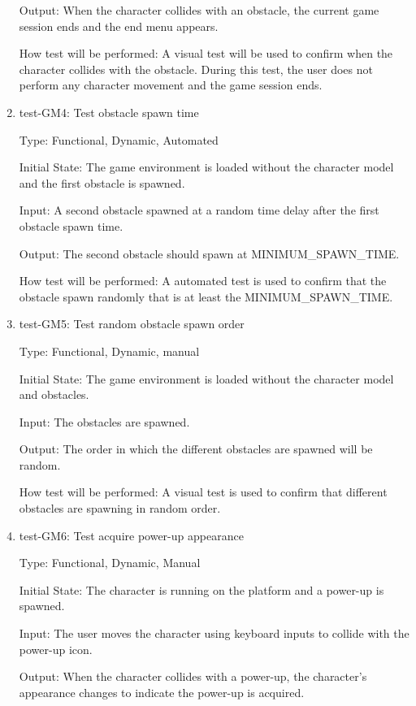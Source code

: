 \documentclass[12pt, titlepage]{article}
\begin{document}
\begin{enumerate}
Output: When the character collides with an obstacle, the current game session ends and the end menu appears.
					
How test will be performed: A visual test will be used to confirm when the character collides with the obstacle. During this test, the user does not perform any character movement and the game session ends.


\item{test-GM4: Test obstacle spawn time\\}

Type: Functional, Dynamic, Automated
					
Initial State: The game environment is loaded without the character model and the first obstacle is spawned.
					
Input: A second obstacle spawned at a random time delay after the first obstacle spawn time.  
					
Output: The second obstacle should spawn at MINIMUM\_SPAWN\_TIME. 
					
How test will be performed: A automated test is used to confirm that the obstacle spawn randomly that is at least the MINIMUM\_SPAWN\_TIME.

\item{test-GM5: Test random obstacle spawn order\\}

Type: Functional, Dynamic, manual
					
Initial State: The game environment is loaded without the character model and obstacles.
					
Input: The obstacles are spawned.  
					
Output: The order in which the different obstacles are spawned will be random. 
					
How test will be performed: A visual test is used to confirm that different obstacles are spawning in random order.

\item{test-GM6: Test acquire power-up appearance\\}

Type: Functional, Dynamic, Manual
					
Initial State: The character is running on the platform and a power-up is spawned.
					
Input: The user moves the character using keyboard inputs to collide with the power-up icon.

Output: When the character collides with a power-up, the character's appearance changes to indicate the power-up is acquired.
					

\end{enumerate}
\end{document}
